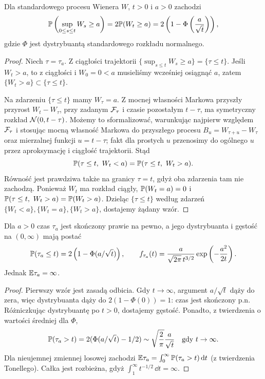 \begin{twierdzenie}
Dla standardowego procesu Wienera $W$, $t>0$ i $a>0$
zachodzi
\[
\mathbb{P}\left(\sup_{0\le s\le t}W_s\ge a\right)
=2\mathbb{P}(W_t\ge a)
=2\left(1-\Phi\left(\frac{a}{\sqrt t}\right)\right),
\]
gdzie $\Phi$ jest dystrybuantą standardowego rozkładu normalnego.
\end{twierdzenie}
\begin{proof}
Niech $\tau=\tau_a$. Z ciągłości trajektorii
$\{\sup_{s\le t}W_s\ge a\}=\{\tau\le t\}$.
Jeśli $W_t>a$, to z ciągłości i $W_0=0<a$ musieliśmy
wcześniej osiągnąć $a$, zatem $\{W_t>a\}\subset\{\tau\le t\}$.

Na zdarzeniu $\{\tau\le t\}$ mamy $W_\tau=a$.
Z mocnej własności Markowa przyszły przyrost
$W_t-W_\tau$, przy zadanym $\mathcal{F}_\tau$ i czasie
pozostałym $t-\tau$, ma symetryczny rozkład
$\mathcal{N}(0,t-\tau)$. Możemy to sformalizować,
warunkując najpierw względem $\mathcal{F}_\tau$ i stosując
mocną własność Markowa do przyszłego procesu
$B_u=W_{\tau+u}-W_\tau$ oraz mierzalnej funkcji
$u=t-\tau$; fakt dla prostych $u$ przenosimy do
ogólnego $u$ przez aproksymację i ciągłość trajektorii.
Stąd
\[
\mathbb{P}(\tau\le t,\ W_t<a)
=\mathbb{P}(\tau\le t,\ W_t>a).
\]
Równość jest prawdziwa także na granicy $\tau=t$,
gdyż oba zdarzenia tam nie zachodzą.
Ponieważ $W_t$ ma rozkład ciągły,
$\mathbb{P}(W_t=a)=0$ i
$\Prob(\tau\le t,\ W_t>a)=\Prob(W_t>a)$.
Dzieląc $\{\tau\le t\}$ według zdarzeń
$\{W_t<a\},\{W_t=a\},\{W_t>a\}$,
dostajemy żądany wzór.
\end{proof}

\begin{wniosek}
Dla $a>0$ czas $\tau_a$ jest skończony prawie na pewno,
a jego dystrybuanta i gęstość na $(0,\infty)$ mają postać
\[
\mathbb{P}(\tau_a\le t)=2\left(1-\Phi(a/\sqrt t)\right),
\qquad
f_{\tau_a}(t)=\frac{a}{\sqrt{2\pi}\,t^{3/2}}
\exp\left(-\frac{a^2}{2t}\right).
\]
Jednak $\mathbb{E}\tau_a=\infty$.
\end{wniosek}
\begin{proof}
Pierwszy wzór jest zasadą odbicia. Gdy $t\to\infty$,
argument $a/\sqrt t$ dąży do zera, więc dystrybuanta
dąży do $2(1-\Phi(0))=1$: czas jest skończony p.n.
Różniczkując dystrybuantę po $t>0$, dostajemy gęstość.
Ponadto, z twierdzenia o wartości średniej dla $\Phi$,
\[
\mathbb{P}(\tau_a>t)=2(\Phi(a/\sqrt t)-1/2)
\sim \sqrt{\frac2\pi}\frac{a}{\sqrt t}
\quad\text{gdy }t\to\infty.
\]
Dla nieujemnej zmiennej losowej zachodzi
$\mathbb{E}\tau_a=\int_0^\infty\mathbb{P}(\tau_a>t)\,\mathrm{d} t$
(z twierdzenia Tonellego). Całka jest rozbieżna,
gdyż $\int_1^\infty t^{-1/2}\,\dd t=\infty$.
\end{proof}

